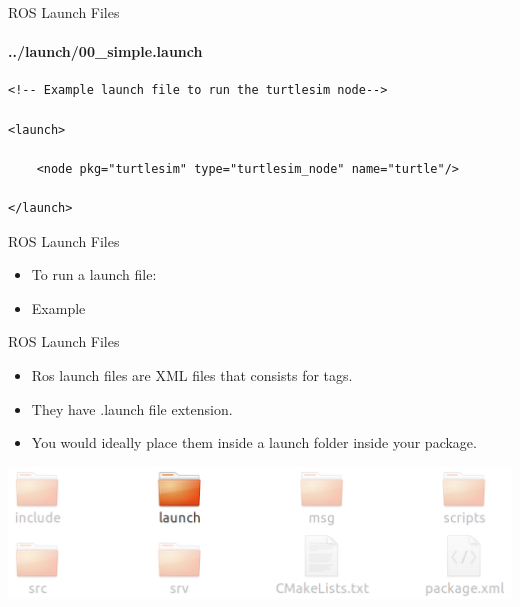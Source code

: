 \documentclass{beamer}
\begin{document}
\begin{frame}[fragile]{ROS Launch Files}
    \framesubtitle{../launch/00\_simple.launch}
    \begin{lstlisting}
<!-- Example launch file to run the turtlesim node-->

<launch>

    <node pkg="turtlesim" type="turtlesim_node" name="turtle"/>

</launch>
    \end{lstlisting}
\end{frame}


\begin{frame}{ROS Launch Files}
    \begin{itemize}
        \item To run a launch file:
             \begin{terminal}
                 \color{green} 
              \end{terminal}
              
        \item Example
        \begin{terminal}
            \color{green} 
          \end{terminal}              
    \end{itemize}  
\end{frame}


\begin{frame}{ROS Launch Files}
    \begin{itemize}
        \item Ros launch files are XML files that consists for tags.
        
        \item They have {\ttfamily \colorbox{gray!30!white}{.launch}} file extension.
        
        \item You would ideally place them inside a {\ttfamily \colorbox{gray!30!white}{launch}} folder inside your package.
    \end{itemize}  
    \includegraphics[width=1.0\linewidth]{figures/package2.png}
\end{frame}
\end{document}
